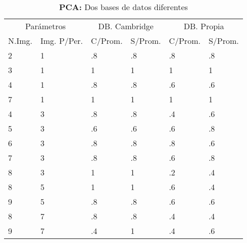 \documentclass[12pt, twocolumn]{article}
\begin{document}
	\begin{table*}[t]
		\centering
		\begin{tabular}{@{}ll|ll|ll@{}}
			\multicolumn{2}{c|}{Parámetros} & \multicolumn{2}{c|}{DB. Cambridge}   & \multicolumn{2}{c}{DB. Propia}        \\
			N.Img.      & Img. P/Per.      & \multicolumn{1}{c|}{C/Prom.} & S/Prom. & \multicolumn{1}{c|}{C/Prom.} & S/Prom. \\ \midrule
			2           & 1                & .8                           & .8      & .8                           & .8      \\
			3           & 1                & 1                            & 1       & 1                            & 1       \\
			4           & 1                & .8                           & .8      & .6                           & .6      \\
			7           & 1                & 1                            & 1       & 1                            & 1       \\
			4           & 3                & .8                           & .8      & .4                           & .6      \\
			5           & 3                & .6                           & .6      & .6                           & .8      \\
			6           & 3                & .8                           & .8      & .8                           & .6      \\
			7           & 3                & .8                           & .8      & .6                           & .8      \\
			8           & 3                & 1                            & 1       & .2                           & .4      \\
			8           & 5                & 1                            & 1       & .6                           & .4      \\
			9           & 5                & .8                           & .8      & .6                           & .6      \\
			8           & 7                & .8                           & .8      & .4                           & .4      \\
			9           & 7                & .4                           & 1       & .4                           & .6     
		\end{tabular}
		\label{pca}
		\caption{\textbf{PCA:} Dos bases de datos diferentes}
	\end{table*}
	
\end{document}
